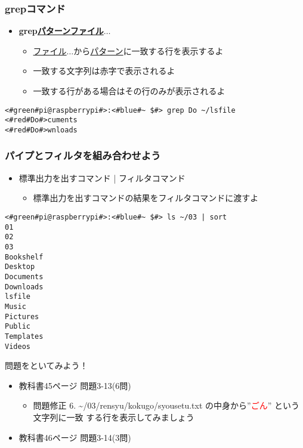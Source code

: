 \begin{frame}[fragile]
    \frametitle{grepコマンド}
    \begin{itemize}
        \item {\bf grep\textvisiblespace\underline{パターン}\textvisiblespace\underline{ファイル}$\ldots$}
        \begin{itemize}
            \small
            \item[] \underline{ファイル}$\ldots$から\underline{パターン}に一致する行を表示するよ
            \item[] 一致する文字列は赤字で表示されるよ
            \item[] 一致する行がある場合はその行のみが表示されるよ
        \end{itemize}
    \end{itemize}
    \begin{lstlisting}[title=grepコマンドの実行例, label=grep_example]
<#green#pi@raspberrypi#>:<#blue#~ $#> grep Do ~/lsfile
<#red#Do#>cuments
<#red#Do#>wnloads
    \end{lstlisting}
\end{frame}

\begin{frame}[fragile]
    \frametitle{パイプとフィルタを組み合わせよう}
    \begin{itemize}
        \item 標準出力を出すコマンド | フィルタコマンド
        \begin{itemize}
            \small
            \item[] 標準出力を出すコマンドの結果をフィルタコマンドに渡すよ
        \end{itemize}
    \end{itemize}
    \begin{lstlisting}[title=パイプラインを用いたsortコマンドの実行例, label=ppsort_example]
<#green#pi@raspberrypi#>:<#blue#~ $#> ls ~/03 | sort
01
02
03
Bookshelf
Desktop
Documents
Downloads
lsfile
Music
Pictures
Public
Templates
Videos
    \end{lstlisting}
\end{frame}

\begin{frame}
    \begin{exampleblock}{問題をといてみよう！}
        \begin{itemize}
            \item 教科書45ページ 問題3-13(6問)
            \begin{itemize}
                \item 問題修正 6. \textasciitilde/03/rensyu/kokugo/syousetu.txt の中身から”\textcolor{red}{ごん}” という文字列に一致
                する行を表示してみましょう
            \end{itemize}
            \item 教科書46ページ 問題3-14(3問)
        \end{itemize}
    \end{exampleblock} 
\end{frame}

